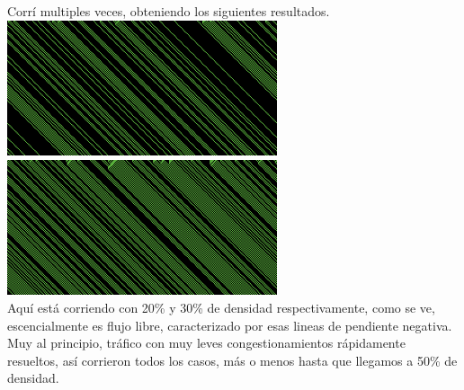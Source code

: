 \documentclass{article}
\begin{document}
\begin{enumerate}
Corrí multiples veces, obteniendo los siguientes resultados.\\
\includegraphics[width=300px]{184-20.png}\\
\includegraphics[width=300px]{184-30.png}\\
Aquí está corriendo con 20\% y 30\% de densidad respectivamente, como se ve, escencialmente es flujo libre, caracterizado por esas lineas de pendiente negativa. Muy al principio, tráfico con muy leves congestionamientos rápidamente resueltos, así corrieron todos los casos, más o menos hasta que llegamos a 50\% de densidad.


\end{enumerate}
\end{document}
